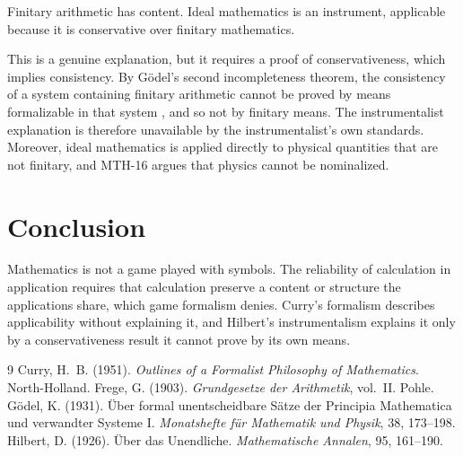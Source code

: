 \documentclass{situationist-preprint}
\begin{document}
\begin{objection}[Hilbert]
Finitary arithmetic has content. Ideal mathematics is an instrument, applicable because it is conservative over finitary mathematics.
\end{objection}

\begin{reply}
This is a genuine explanation, but it requires a proof of conservativeness, which implies consistency. By Gödel's second incompleteness theorem, the consistency of a system containing finitary arithmetic cannot be proved by means formalizable in that system \citep{Godel1931}, and so not by finitary means. The instrumentalist explanation is therefore unavailable by the instrumentalist's own standards. Moreover, ideal mathematics is applied directly to physical quantities that are not finitary, and MTH-16 argues that physics cannot be nominalized.
\end{reply}

\section{Conclusion}

Mathematics is not a game played with symbols. The reliability of calculation in application requires that calculation preserve a content or structure the applications share, which game formalism denies. Curry's formalism describes applicability without explaining it, and Hilbert's instrumentalism explains it only by a conservativeness result it cannot prove by its own means.

\begin{thebibliography}{9}\small
{} Curry, H.~B. (1951). \emph{Outlines of a Formalist Philosophy of Mathematics}. North-Holland.
 Frege, G. (1903). \emph{Grundgesetze der Arithmetik}, vol.~II. Pohle.
 G\"odel, K. (1931). \"Uber formal unentscheidbare S\"atze der Principia Mathematica und verwandter Systeme I. \emph{Monatshefte f\"ur Mathematik und Physik}, 38, 173--198.
 Hilbert, D. (1926). \"Uber das Unendliche. \emph{Mathematische Annalen}, 95, 161--190.
\end{thebibliography}
\end{document}
